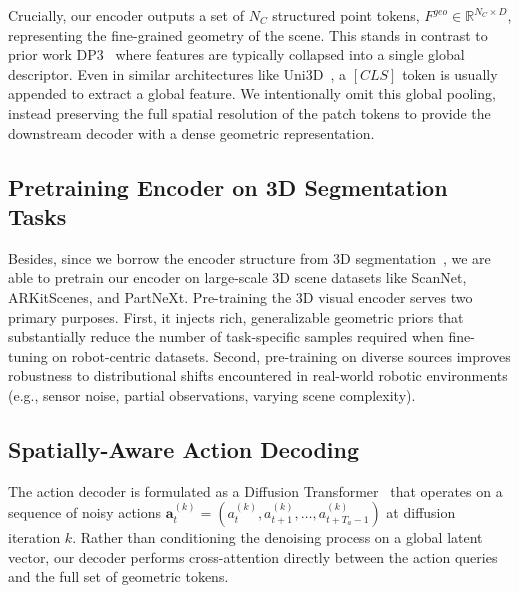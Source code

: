 \documentclass[runningheads]{llncs}
\begin{document}
Crucially, our encoder outputs a set of $N_C$ structured point tokens, $F^{geo} \in \mathbb{R}^{N_C \times D}$, representing the fine-grained geometry of the scene. This stands in contrast to prior work DP3~\cite{ze20243d} where features are typically collapsed into a single global descriptor. Even in similar architectures like Uni3D~\cite{zhou2023uni3d}, a $[CLS]$ token is usually appended to extract a global feature. We intentionally omit this global pooling, instead preserving the full spatial resolution of the patch tokens to provide the downstream decoder with a dense geometric representation.

\subsection{Pretraining Encoder on 3D Segmentation Tasks}
Besides, since we borrow the encoder structure from 3D segmentation~\cite{zhou2024point}, we are able to pretrain our encoder on large-scale 3D scene datasets like ScanNet\cite{dai2017scannet}, ARKitScenes\cite{baruch2021arkitscenes}, and PartNeXt\cite{wangpartnext}. Pre-training the 3D visual encoder serves two primary purposes. First, it injects rich, generalizable geometric priors that substantially reduce the number of task-specific samples required when fine-tuning on robot-centric datasets. Second, pre-training on diverse sources improves robustness to distributional shifts encountered in real-world robotic environments (e.g., sensor noise, partial observations, varying scene complexity). 


\subsection{Spatially-Aware Action Decoding}
\label{sec:decoder}

The action decoder is formulated as a Diffusion Transformer~\cite{peebles2023scalable} that operates on a sequence of noisy actions $\mathbf{a}^{(k)}_t = (a^{(k)}_t, a^{(k)}_{t+1}, \dots, a^{(k)}_{t+T_a-1})$ at diffusion iteration $k$. Rather than conditioning the denoising process on a global latent vector, our decoder performs cross-attention directly between the action queries and the full set of geometric tokens.
\end{document}
